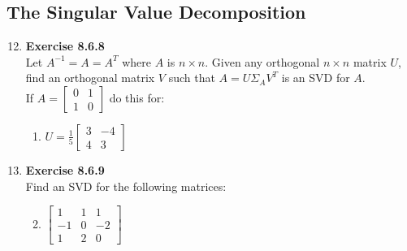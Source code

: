 \documentclass[12pt, a4paper]{scrartcl}
\begin{document}
    \subsection*{The Singular Value Decomposition}
        \begin{enumerate}
            \setcounter{enumi}{11}
            \item \textbf{Exercise 8.6.8}\\Let $A^{-1}=A=A^T$ where $A$ is $n \times n$. Given any orthogonal $n \times n$ matrix $U$, find an orthogonal matrix $V$ such that $A=U\Sigma _AV^T$ is an SVD for $A$.\\If $A=\begin{bmatrix}
                0&1\\1&0
            \end{bmatrix}$ do this for:
            \begin{enumerate}
                \item $U=\frac{1}{5}\begin{bmatrix}
                    3&-4\\4&3
                \end{bmatrix}$

            \end{enumerate}
            
            \item \textbf{Exercise 8.6.9}\\Find an SVD for the following matrices:
            \begin{enumerate}
                \setcounter{enumii}{1}
                \item $\begin{bmatrix}
                    1 & 1 & 1\\
                    -1 & 0 & -2\\
                    1 & 2 & 0
                \end{bmatrix}$

            \end{enumerate}
        \end{enumerate}
\end{document}
